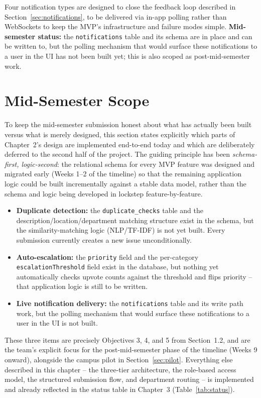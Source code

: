 \documentclass[11pt]{report}
\begin{document}
Four notification types are designed to close the feedback loop
described in Section~\ref{sec:notifications}, to be delivered via
in-app polling rather than WebSockets to keep the MVP's infrastructure
and failure modes simple. \textbf{Mid-semester status:} the
\texttt{notifications} table and its schema are in place and can be
written to, but the polling mechanism that would surface these
notifications to a user in the UI has not been built yet; this is also
scoped as post-mid-semester work.

\section{Mid-Semester Scope}
\label{sec:mst-scope}

To keep the mid-semester submission honest about what has actually been
built versus what is merely designed, this section states explicitly
which parts of Chapter~2's design are implemented end-to-end today and
which are deliberately deferred to the second half of the project. The
guiding principle has been \emph{schema-first, logic-second}: the
relational schema for every MVP feature was designed and migrated
early (Weeks 1--2 of the timeline) so that the remaining application
logic could be built incrementally against a stable data model, rather
than the schema and logic being developed in lockstep feature-by-feature.

\begin{itemize}
  \item \textbf{Duplicate detection:} the \texttt{duplicate\_checks}
    table and the description/location/department matching structure
    exist in the schema, but the similarity-matching logic (NLP/TF-IDF)
    is not yet built. Every submission currently creates a new issue
    unconditionally.
  \item \textbf{Auto-escalation:} the \texttt{priority} field and the
    per-category \texttt{escalationThreshold} field exist in the
    database, but nothing yet automatically checks upvote counts
    against the threshold and flips priority -- that application logic
    is still to be written.
  \item \textbf{Live notification delivery:} the \texttt{notifications}
    table and its write path work, but the polling mechanism that would
    surface these notifications to a user in the UI is not built.
\end{itemize}

These three items are precisely Objectives 3, 4, and 5 from
Section~1.2, and are the team's explicit focus for the post-mid-semester
phase of the timeline (Weeks 9 onward), alongside the campus pilot in
Section~\ref{sec:pilot}. Everything else described in this
chapter -- the three-tier architecture, the role-based access model, the
structured submission flow, and department routing -- is implemented
and already reflected in the status table in Chapter~3
(Table~\ref{tab:status}).
\end{document}
